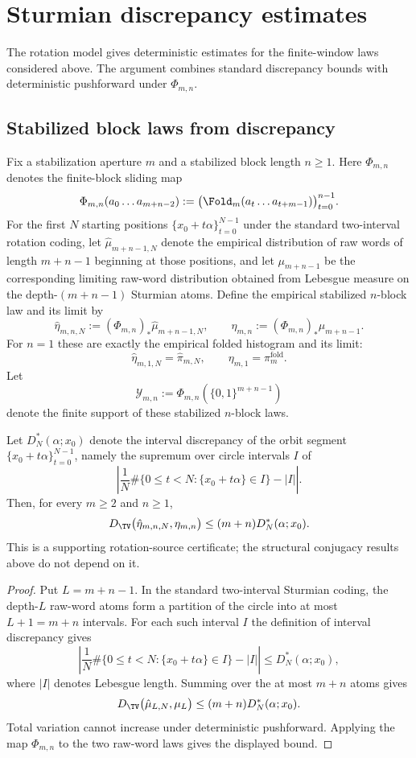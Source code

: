 \section{Sturmian discrepancy estimates}\label{sec:fp:tv}

The rotation model gives deterministic estimates for the finite-window laws considered above. The argument combines standard discrepancy bounds with deterministic pushforward under $\Phi_{m,n}$.

\subsection{Stabilized block laws from discrepancy}

Fix a stabilization aperture $m$ and a stabilized block length $n\ge 1$. Here $\Phi_{m,n}$ denotes the finite-block sliding map
\[
\Phi_{m,n}(a_0\ldots a_{m+n-2})
:=
\bigl(\Fold_m(a_t\ldots a_{t+m-1})\bigr)_{t=0}^{n-1}.
\]
For the first $N$ starting positions $\{x_0+t\alpha\}_{t=0}^{N-1}$ under the standard two-interval rotation coding, let $\hat{\mu}_{m+n-1,N}$ denote the empirical distribution of raw words of length $m+n-1$ beginning at those positions, and let $\mu_{m+n-1}$ be the corresponding limiting raw-word distribution obtained from Lebesgue measure on the depth-$(m+n-1)$ Sturmian atoms. Define the empirical stabilized $n$-block law and its limit by
\[
\hat{\eta}_{m,n,N}:=(\Phi_{m,n})_*\hat{\mu}_{m+n-1,N},
\qquad
\eta_{m,n}:=(\Phi_{m,n})_*\mu_{m+n-1}.
\]
For $n=1$ these are exactly the empirical folded histogram and its limit:
\[
\hat{\eta}_{m,1,N}=\hat{\pi}_{m,N},
\qquad
\eta_{m,1}=\pi_m^{\mathrm{fold}}.
\]
Let
\[
\mathcal Y_{m,n}:=\Phi_{m,n}(\{0,1\}^{m+n-1})
\]
denote the finite support of these stabilized $n$-block laws.

\begin{theorem}\label{thm:tv-certificate}
Let $D_N^*(\alpha;x_0)$ denote the interval discrepancy of the orbit segment
$\{x_0+t\alpha\}_{t=0}^{N-1}$, namely the supremum over circle intervals $I$
of
\[
\left|
\frac1N\#\{0\le t<N:\{x_0+t\alpha\}\in I\}-|I|
\right|.
\]
Then, for every $m\ge2$ and $n\ge1$,
\[
D_{\TV}\bigl(\hat{\eta}_{m,n,N},\eta_{m,n}\bigr)
\le (m+n)D_N^*(\alpha;x_0).
\]
This is a supporting rotation-source certificate; the structural conjugacy
results above do not depend on it.
\end{theorem}

\begin{proof}
Put $L=m+n-1$.  In the standard two-interval Sturmian coding, the depth-$L$
raw-word atoms form a partition of the circle into at most $L+1=m+n$
intervals.  For each such interval $I$ the definition of interval discrepancy
gives
\[
\left|
\frac1N\#\{0\le t<N:\{x_0+t\alpha\}\in I\}-|I|
\right|
\le D_N^*(\alpha;x_0),
\]
where $|I|$ denotes Lebesgue length.  Summing over the at most $m+n$ atoms gives
\[
D_{\TV}\bigl(\hat{\mu}_{L,N},\mu_L\bigr)
\le (m+n)D_N^*(\alpha;x_0).
\]
Total variation cannot increase under deterministic pushforward.  Applying
the map $\Phi_{m,n}$ to the two raw-word laws gives the displayed bound.
\end{proof}

